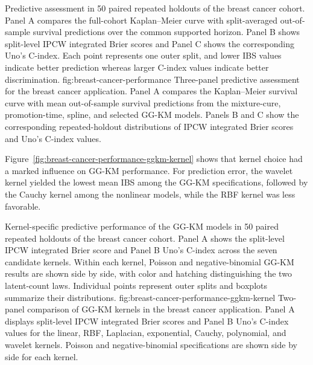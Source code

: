 {Predictive assessment in 50 paired repeated holdouts of the breast cancer
cohort. Panel A compares the full-cohort Kaplan--Meier curve with
split-averaged out-of-sample survival predictions over the common supported
horizon. Panel B shows split-level IPCW integrated Brier scores and Panel C
shows the corresponding Uno's C-index. Each point represents one outer split, and
lower IBS values indicate better prediction whereas larger C-index values
indicate better discrimination.}
{fig:breast-cancer-performance}
{Three-panel predictive assessment for the breast cancer application. Panel A
compares the Kaplan--Meier survival curve with mean out-of-sample survival
predictions from the mixture-cure, promotion-time, spline, and selected GG-KM
models. Panels B and C show the corresponding repeated-holdout distributions
of IPCW integrated Brier scores and Uno's C-index values.}

Figure~\ref{fig:breast-cancer-performance-ggkm-kernel} shows that kernel
choice had a marked influence on GG-KM performance. For prediction error,
the wavelet kernel yielded the lowest mean IBS among the GG-KM
specifications, followed by the Cauchy kernel among the nonlinear models,
while the RBF kernel was less favorable.

{Kernel-specific predictive performance of the GG-KM models in 50 paired
repeated holdouts of the breast cancer cohort. Panel A shows the split-level
IPCW integrated Brier score and Panel B Uno's C-index across the seven candidate
kernels. Within each kernel, Poisson and negative-binomial GG-KM results are
shown side by side, with color and hatching distinguishing the two
latent-count laws. Individual points represent outer splits and boxplots
summarize their distributions.}
{fig:breast-cancer-performance-ggkm-kernel}
{Two-panel comparison of GG-KM kernels in the breast cancer application.
Panel A displays split-level IPCW integrated Brier scores and Panel B Uno's C-index
values for the linear, RBF, Laplacian, exponential, Cauchy, polynomial,
and wavelet kernels. Poisson and negative-binomial specifications are shown
side by side for each kernel.}
